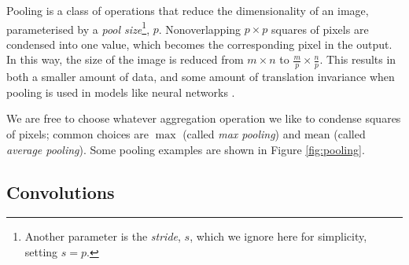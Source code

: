         Pooling is a class of operations that reduce the dimensionality of an
        image, parameterised by a \emph{pool size}\footnote{Another
        parameter is the \emph{stride}, $s$, which we ignore here for simplicity,
        setting $s = p$.}, $p$. Nonoverlapping $p \times p$ squares of pixels are
        condensed into one value, which becomes the corresponding pixel in the
        output. In this way, the size of the image is reduced from $m \times n$
        to $\frac{m}{p} \times \frac{n}{p}$. This results in both a smaller
        amount of data, and some amount of translation invariance when pooling
        is used in models like neural networks \citep{scherer10}.

        We are free to choose whatever aggregation operation we like to condense
        squares of pixels; common choices are $\max$ (called \emph{max pooling})
        and $\mbox{mean}$ (called \emph{average pooling}). Some pooling examples
        are shown in Figure \ref{fig:pooling}.

    \subsection{Convolutions}
    \label{sec:convolutions}

